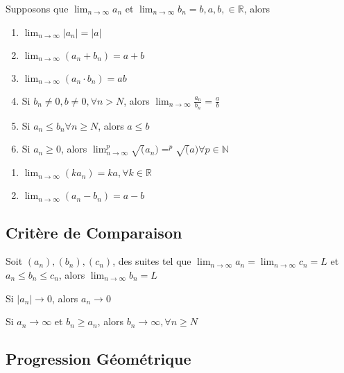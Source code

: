 \documentclass{article}
\begin{document}
\begin{theorem}
    Supposons que $\lim_{n \to \infty} a_n$ et $\lim_{n \to \infty} b_n =b,
    a,b, \in \mathbb{R}$, alors
    \begin{enumerate}
	\item $\lim_{n \to \infty} |a_n| = |a|$
	\item $\lim_{n \to \infty} (a_n + b_n) = a+b$
	\item $\lim_{n \to \infty} (a_n \cdot b_n) = ab$
	\item Si $b_n \neq 0, b \neq 0, \forall n > N$, alors
	    $\lim_{n \to \infty} \frac{a_n}{b_n} = \frac{a}{b}$
	\item Si $a_n \leq b_n \forall n \geq N$, alors $a \leq b$
	\item Si $a_n \geq 0$, alors $\lim_{n \to \infty} ^p\sqrt(a_n) = ^p\sqrt(a)
	    \forall p \in \mathbb{N}$
    \end{enumerate}
\end{theorem}

\begin{corollary}
    \begin{enumerate}
	\item $\lim_{n \to \infty} (k a_n) =ka , \forall k \in \mathbb{R}$
	\item $\lim_{n \to \infty} (a_n - b_n) = a-b$
    \end{enumerate}
\end{corollary}

\subsection{Critère de Comparaison}

\begin{theorem}
    Soit $(a_n), (b_n), (c_n)$, des suites tel que $\lim_{n \to \infty} a_n =
    \lim_{n \to \infty} c_n = L$ et $a_n \leq b_n \leq c_n$, alors
    $\lim_{n \to \infty} b_n = L$
\end{theorem}

\begin{corollary}
    Si $|a_n| \rightarrow 0$, alors $a_n \rightarrow 0$
\end{corollary}

\begin{theorem}
    Si $a_n \rightarrow \infty$ et $ b_n \geq a_n$, alors $b_n \rightarrow \infty,
    \forall n \geq N$
\end{theorem}

\subsection{Progression Géométrique}
\end{document}
